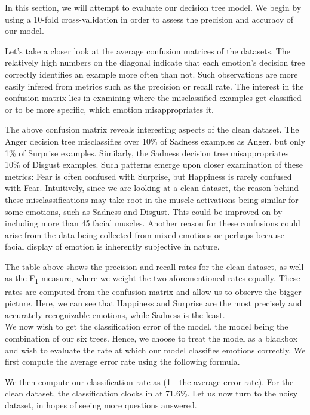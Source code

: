 In this section, we will attempt to evaluate our decision tree model. We begin by using a 10-fold cross-validation
in order to assess the precision and accuracy of our model. 

Let's take a closer look at the average confusion matrices of the datasets.
The relatively high numbers on the diagonal indicate that each emotion's decision tree correctly
identifies an example more often than not. Such observations are more easily infered from metrics such as the precision or recall rate.
The interest in the confusion matrix lies in examining where the misclassified examples get classified or to be more specific,
which emotion misappropriates it. 



The above confusion matrix reveals interesting aspects of the clean dataset.
The Anger decision tree misclassifies over 10\% of Sadness examples as Anger, but only 1\% of Surprise examples.
Similarly, the Sadness decision tree misappropriates 10\% of Disgust examples.
Such patterns emerge upon closer examination of these metrics: Fear is often confused with Surprise, but Happiness is rarely confused with Fear.
Intuitively, since we are looking at a clean dataset,
the reason behind these misclassifications may take root in the muscle activations being similar for some emotions, such as Sadness and Disgust.
This could be improved on by including  more than 45 facial muscles.
Another reason for these confusions could arise from the data being collected from mixed emotions or perhaps because facial display
of emotion is inherently subjective in nature.



The table above shows the precision and recall rates for the clean dataset, as well as the F\textsubscript{1} measure,
where we weight the two aforementioned rates equally. These rates are computed from the confusion matrix and allow us to
observe the bigger picture. Here, we can see that Happiness and Surprise are the most precisely and accurately recognizable
emotions, while Sadness is the least. \\


\newpage
We now wish to get the classification error of the model, the model being the combination of our six trees.
Hence, we choose to treat the model as a blackbox and wish to evaluate the rate at which our model classifies emotions correctly.
We first compute the average error rate using the following formula.

We then compute our classification rate as (1 - the average error rate).
For the clean dataset, the classification clocks in at 71.6\%.
Let us now turn to the noisy dataset, in hopes of seeing more questions answered.

